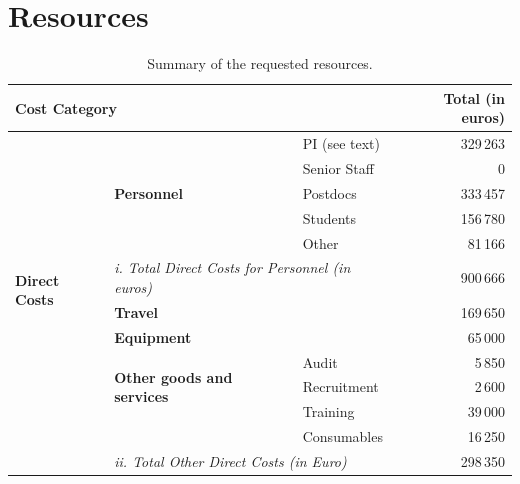 \documentclass[11pt,a4paper]{article}
\begin{document}
\section{Resources}
\begin{table}[!htb]
\setlength{\extrarowheight}{2pt}
  \centering
  \caption{Summary of the requested resources.}
  \label{tab:resources}
  \begin{tabular}{|l|l|l|r|}\hline
    \multicolumn{3}{|l|}{\bfseries Cost Category} & {\bfseries Total (in euros)} \\ \hline
    \multirow{12}{*}{\bfseries Direct Costs} & \multirow{5}{*}{\bfseries Personnel} & PI (see text) & 329\,263  \\ \cline{3-4}
                                       &                                & Senior Staff & 0 \\ \cline{3-4}
                                       &                                & Postdocs     &  333\,457 \\ \cline{3-4}
                                       &                                & Students     &  156\,780 \\ \cline{3-4}
                                       &                                & Other        &  81\,166  \\ \cline{2-4}
                                       & \multicolumn{2}{|l|}{\itshape i. Total Direct Costs for Personnel (in euros)} & 900\,666 \\\cline{2-4}
                                       & \multicolumn{2}{|l|}{\bfseries Travel} &  169\,650 \\\cline{2-4}
                                       & \multicolumn{2}{|l|}{\bfseries Equipment} &  65\,000  \\\cline{2-4}
                                       & \multirow{3}{*}{\bfseries Other goods and services} & Audit              &  5\,850 \\\cline{3-4}
                                       &                                & Recruitment        &   2\,600   \\\cline{3-4}
                                       &                                & Training        &   39\,000   \\\cline{3-4}
                                       &                                & Consumables        &   16\,250   \\\cline{3-4}
                                       & \multicolumn{2}{|l|}{\itshape ii. Total Other Direct Costs (in Euro)} & 298\,350 \\ \hline

\end{tabular}
\end{table}
\end{document}
